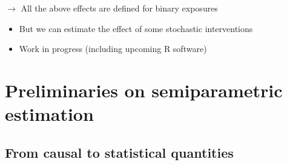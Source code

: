 \documentclass[
  12pt,
]{book}
\providecommand{\tightlist}{%
  \setlength{\itemsep}{0pt}\setlength{\parskip}{0pt}}
\theoremstyle{definition}
\theoremstyle{definition}
\theoremstyle{definition}
\newcommand{\1}{\mathbbm{1}}
\begin{document}
\(\rightarrow\) All the above effects are defined for binary exposures

\begin{itemize}
\tightlist
\item
  But we can estimate the effect of some stochastic interventions
\item
  Work in progress (including upcoming R software)
\end{itemize}

\hypertarget{preliminaries-on-semiparametric-estimation}{%
\chapter{Preliminaries on semiparametric estimation}\label{preliminaries-on-semiparametric-estimation}}

\hypertarget{from-causal-to-statistical-quantities}{%
\section{From causal to statistical quantities}\label{from-causal-to-statistical-quantities}}
\end{document}
